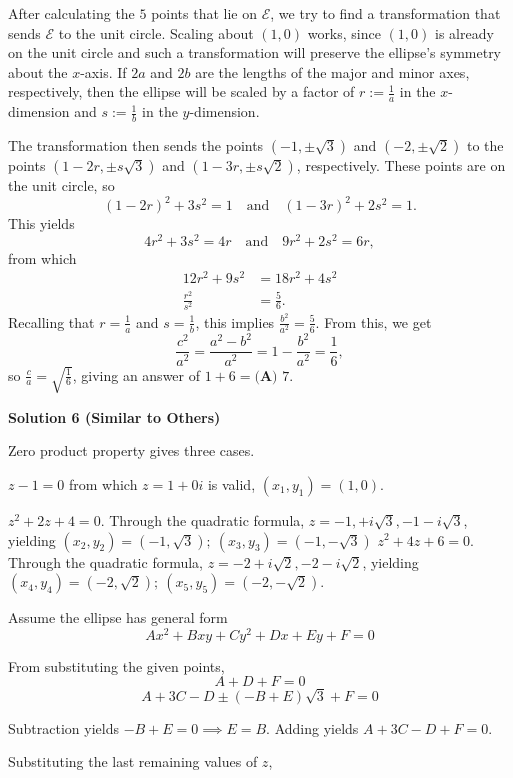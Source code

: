 \begin{enumerate}
After calculating the $5$ points that lie on $\mathcal E$, we try to find a transformation that sends $\mathcal E$ to the unit circle. Scaling about $(1, 0)$ works, since $(1, 0)$ is already on the unit circle and such a transformation will preserve the ellipse's symmetry about the $x$-axis. If $2a$ and $2b$ are the lengths of the major and minor axes, respectively, then the ellipse will be scaled by a factor of $r := \frac1a$ in the $x$-dimension and $s := \frac1b$ in the $y$-dimension.

 The transformation then sends the points $\left(-1,\pm\sqrt 3\right)$ and $\left(-2,\pm\sqrt 2\right)$ to the points $\left(1-2r, \pm s\sqrt 3\right)$ and $\left(1-3r, \pm s\sqrt 2\right)$, respectively. These points are on the unit circle, so
 \[(1-2r)^2 + 3s^2 = 1 \quad \text{and} \quad (1-3r)^2 + 2s^2 = 1.\]This yields 
 \[4r^2 + 3s^2 = 4r \quad \text{and} \quad 9r^2 + 2s^2 = 6r,\] from which
 \begin{align*} 12r^2 + 9s^2 &= 18r^2 + 4s^2 \\ \frac{r^2}{s^2} &= \frac56. \end{align*}
Recalling that $r = \frac1a$ and $s = \frac1b$, this implies $\frac{b^2}{a^2} = \frac56$. From this, we get
 \[\frac{c^2}{a^2} = \frac{a^2-b^2}{a^2} = 1 - \frac{b^2}{a^2} = \frac{1}{6},\]so $\frac ca = \sqrt{\frac16}$, giving an answer of $1 + 6 = \boxed{\textbf{(A) } 7}$.

 



\textbf{Solution 6 (Similar to Others)}

Zero product property gives three cases.

 $z-1 = 0$ from which $z = 1 + 0i$ is valid, $(x_1,y_1) = (1,0)$. 

 $z^2+2z+4 = 0$. Through the quadratic formula, $z = -1, + i\sqrt{3}, -1 - i\sqrt{3}$, yielding $(x_2, y_2) = (-1, \sqrt{3}) ; \ (x_3,y_3) = (-1, -\sqrt{3})$
$z^2 + 4z + 6 = 0$. Through the quadratic formula, $z = -2 + i\sqrt{2}, -2 - i\sqrt{2}$, yielding $(x_4,y_4) = (-2, \sqrt{2}); \ (x_5, y_5) = (-2, -\sqrt{2})$.

 Assume the ellipse has general form
 \[Ax^2+Bxy+Cy^2+Dx+Ey+F=0\]

 From substituting the given points, 
 \[A+D+F=0\]
 \[A+3C-D\pm(-B+E)\sqrt3+F=0\]

 Subtraction yields $-B+E=0\implies E=B$. Adding yields $A+3C-D+F=0$. 

 Substituting the last remaining values of $z$, 


\end{enumerate}
